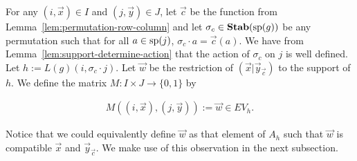 \documentclass[../paper.tex]{subfiles}
\begin{document}

For any $(i, \vec{x}) \in I$ and $(j, \vec{y}) \in J$, let $\vec{c}$ be the
function from Lemma~\ref{lem:permutation-row-column} and let $\sigma_{c} \in
\text{\textbf{Stab}} (\text{sp} (g))$ be any permutation such that for all $a \in \text{sp}(j)$, $\sigma_{c}
\cdot a = \vec{c}(a)$. We have from Lemma~\ref{lem:support-determine-action}
that the action of $\sigma_{c}$ on $j$ is well defined. Let $h := L(g)(i,
\sigma_c \cdot j)$. Let $\vec{w}$ be the restriction of $(\vec{x} \vert
\vec{y}_{\vec{c}})$ to the support of $h$. We define the matrix $M : I \times J
\rightarrow \{0,1\}$ by

\begin{align*}
	M((i , \vec{x}), (j, \vec{y})) := \vec{w} \in EV_h. 
\end{align*}

Notice that we could equivalently define $\vec{w}$ as that element of $A_h$ such
that $\vec{w}$ is compatible $\vec{x}$ and $\vec{y}_{\vec{c}}$. We make use of
this observation in the next subsection.

\end{document}
